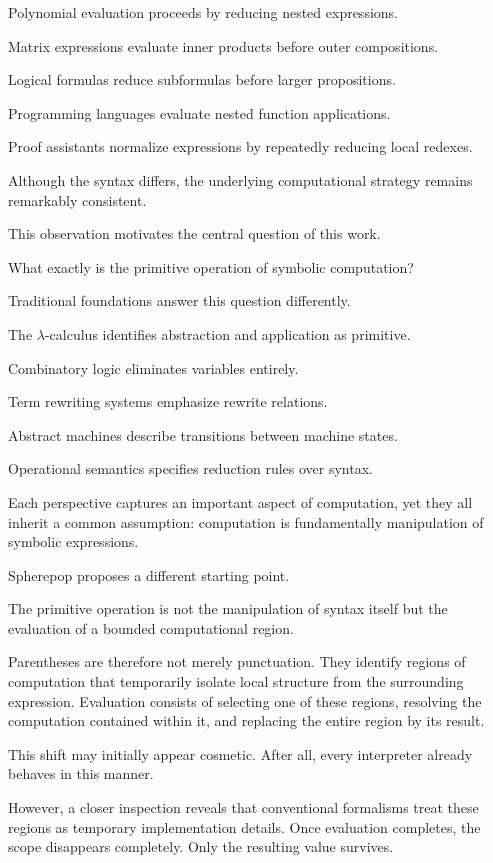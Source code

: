 \documentclass[12pt,oneside]{article}
\theoremstyle{definition}
\theoremstyle{remark}
\begin{document}
Polynomial evaluation proceeds by reducing nested expressions.

Matrix expressions evaluate inner products before outer compositions.

Logical formulas reduce subformulas before larger propositions.

Programming languages evaluate nested function applications.

Proof assistants normalize expressions by repeatedly reducing local
redexes.

Although the syntax differs, the underlying computational strategy remains
remarkably consistent.

This observation motivates the central question of this work.

What exactly is the primitive operation of symbolic computation?

Traditional foundations answer this question differently.

The $\lambda$-calculus identifies abstraction and application as primitive.

Combinatory logic eliminates variables entirely.

Term rewriting systems emphasize rewrite relations.

Abstract machines describe transitions between machine states.

Operational semantics specifies reduction rules over syntax.

Each perspective captures an important aspect of computation, yet they all
inherit a common assumption: computation is fundamentally manipulation of
symbolic expressions.

Spherepop proposes a different starting point.

The primitive operation is not the manipulation of syntax itself but the
evaluation of a bounded computational region.

Parentheses are therefore not merely punctuation.
They identify regions of computation that temporarily isolate local structure
from the surrounding expression.
Evaluation consists of selecting one of these regions, resolving the
computation contained within it, and replacing the entire region by its
result.

This shift may initially appear cosmetic.
After all, every interpreter already behaves in this manner.

However, a closer inspection reveals that conventional formalisms treat these
regions as temporary implementation details.
Once evaluation completes, the scope disappears completely.
Only the resulting value survives.
\end{document}
